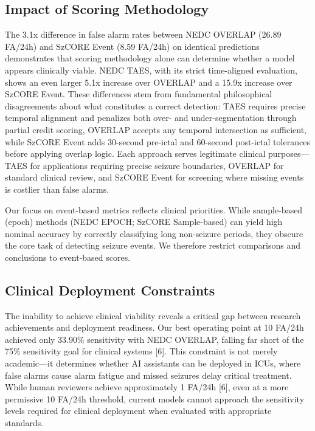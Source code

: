 \documentclass[
]{article}
\begin{document}
\hypertarget{impact-of-scoring-methodology}{%
\subsection{Impact of Scoring
Methodology}\label{impact-of-scoring-methodology}}

The 3.1x difference in false alarm rates between NEDC OVERLAP (26.89
FA/24h) and SzCORE Event (8.59 FA/24h) on identical predictions
demonstrates that scoring methodology alone can determine whether a
model appears clinically viable. NEDC TAES, with its strict time-aligned
evaluation, shows an even larger 5.1x increase over OVERLAP and a 15.9x
increase over SzCORE Event. These differences stem from fundamental
philosophical disagreements about what constitutes a correct detection:
TAES requires precise temporal alignment and penalizes both over- and
under-segmentation through partial credit scoring, OVERLAP accepts any
temporal intersection as sufficient, while SzCORE Event adds 30-second
pre-ictal and 60-second post-ictal tolerances before applying overlap
logic. Each approach serves legitimate clinical purposes---TAES for
applications requiring precise seizure boundaries, OVERLAP for standard
clinical review, and SzCORE Event for screening where missing events is
costlier than false alarms.

Our focus on event-based metrics reflects clinical priorities. While
sample-based (epoch) methods (NEDC EPOCH; SzCORE Sample-based) can yield
high nominal accuracy by correctly classifying long non-seizure periods,
they obscure the core task of detecting seizure events. We therefore
restrict comparisons and conclusions to event-based scores.

\hypertarget{clinical-deployment-constraints}{%
\subsection{Clinical Deployment
Constraints}\label{clinical-deployment-constraints}}

The inability to achieve clinical viability reveals a critical gap
between research achievements and deployment readiness. Our best
operating point at 10 FA/24h achieved only 33.90\% sensitivity with NEDC
OVERLAP, falling far short of the 75\% sensitivity goal for clinical
systems {[}6{]}. This constraint is not merely academic---it determines
whether AI assistants can be deployed in ICUs, where false alarms cause
alarm fatigue and missed seizures delay critical treatment. While human
reviewers achieve approximately 1 FA/24h {[}6{]}, even at a more
permissive 10 FA/24h threshold, current models cannot approach the
sensitivity levels required for clinical deployment when evaluated with
appropriate standards.
\end{document}
